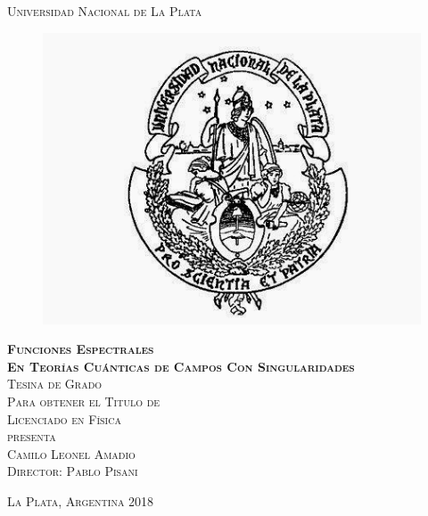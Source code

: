\documentclass[11pt]{book}
\begin{document}
\begin{titlepage}
\begin{center}

\textsc{\Large Universidad Nacional de La Plata}\\[4em]

\begin{figure}[h]
\begin{center}
\includegraphics[width=5 cm]{Escudo.jpg}
\end{center}
\end{figure}

\vspace{1em}

\textsc{\huge \textbf{
Funciones Espectrales \\
En Teorías Cuánticas de Campos Con Singularidades
}}\\[4em]

\textsc{\large Tesina de Grado}\\[1em]

\textsc{Para obtener el Titulo de }\\[1em]

\textsc{Licenciado en Física}\\[1em]

\textsc{presenta}\\[1em]

\textsc{\Large Camilo Leonel Amadio}\\[1em]

\textsc{\large Director: Pablo Pisani}

\end{center}

\vspace*{\fill}
\textsc{La Plata, Argentina \hspace*{\fill} 2018}

\end{titlepage}
\end{document}
